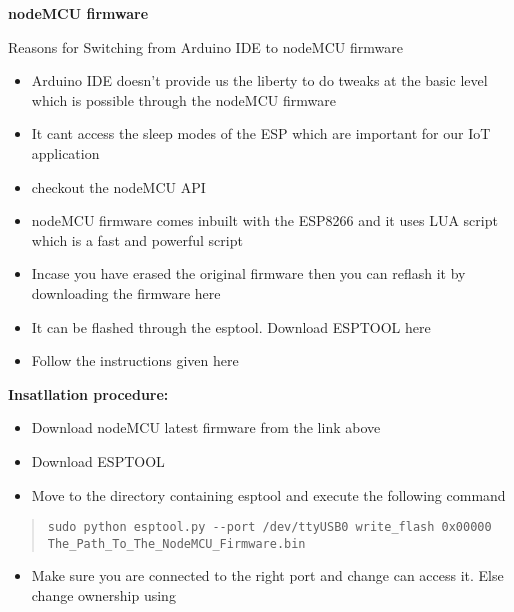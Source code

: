 \documentclass[16pt]{article}
\begin{document}
\vspace{5cm}
{\LARGE{\textbf{nodeMCU firmware}}}

Reasons for Switching from Arduino IDE to nodeMCU firmware

\begin{itemize}

\item
  Arduino IDE doesn't provide us the liberty to do tweaks at the basic
  level which is possible through the nodeMCU firmware
\item
  It cant access the sleep modes of the ESP which are important for our
  IoT application
\item
  checkout the nodeMCU API
\item
  nodeMCU firmware comes inbuilt with the ESP8266 and it uses LUA script
  which is a fast and powerful script
\item
  Incase you have erased the original firmware then you can reflash it
  by downloading the firmware here
\item
  It can be flashed through the esptool. Download ESPTOOL here
\item
  Follow the instructions given here
 
\end{itemize}

\textbf{Insatllation procedure:}

\begin{itemize}

\item
  Download nodeMCU latest firmware from the link above
\item
  Download ESPTOOL
\item
  Move to the directory containing esptool and execute the following
  command
\end{itemize}

\begin{quote}
\texttt{sudo python esptool.py -{}-port /dev/ttyUSB0  write\_flash 0x00000 The\_Path\_To\_The\_NodeMCU\_Firmware.bin}
\end{quote}

\begin{itemize}

\item
  Make sure you are connected to the right port and change can access
  it. Else change ownership using
\end{itemize}
\end{document}
